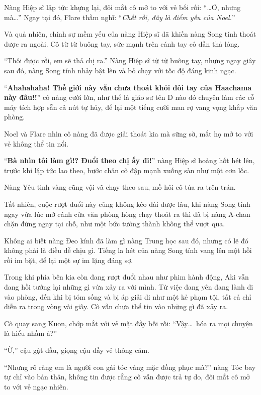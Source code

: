 \documentclass[../main.tex]{subfiles}
\begin{document}
Nàng Hiệp sĩ lập tức khựng lại, đôi mắt cô mở to với vẻ bối rối: ``\dots Ơ, nhưng mà\dots'' Ngay tại đó, Flare thầm nghĩ: ``\textit{Chết rồi, đây là điểm yếu của Noel.}''

Và quả nhiên, chính sự mềm yếu của nàng Hiệp sĩ đã khiến nàng Song tính thoát được ra ngoài. Cô từ từ buông tay, sức mạnh trên cánh tay cô dần thả lỏng.

``Thôi được rồi, em sẽ thả chị ra.'' Nàng Hiệp sĩ từ từ buông tay, nhưng ngay giây sau đó, nàng Song tính nhảy bật lên và bỏ chạy với tốc độ đáng kinh ngạc.

``\textbf{Ahahahaha! Thế giới này vẫn chưa thoát khỏi đôi tay của Haachama này đâu!!}'' cô nàng cười lớn, như thể là giáo sư tên D nào đó chuyên làm các cỗ máy tích hợp sẵn cả nút tự hủy, để lại một tiếng cười man rợ vang vọng khắp văn phòng.

Noel và Flare nhìn cô nàng đã được giải thoát kia mà sững sờ, mắt họ mở to với vẻ không thể tin nổi.

``\textbf{Bà nhìn tôi làm gì!? Đuổi theo chị ấy đi!}'' nàng Hiệp sĩ hoảng hốt hét lên, trước khi lập tức lao theo, bước chân cô đập mạnh xuống sàn như một cơn lốc.

Nàng Yêu tinh vàng cũng vội vã chạy theo sau, mồ hôi cô túa ra trên trán.

Tất nhiên, cuộc rượt đuổi này cũng không kéo dài được lâu, khi nàng Song tính ngay vừa lúc mở cánh cửa văn phòng hòng chạy thoát ra thì đã bị nàng A-chan chặn đứng ngay tại chỗ, như một bức tường thành không thể vượt qua.

Không ai biết nàng Đeo kính đã làm gì nàng Trung học sau đó, nhưng có lẽ đó không phải là điều dễ chịu gì. Tiếng la hét của nàng Song tính vang lên một hồi rồi im bặt, để lại một sự im lặng đáng sợ.

Trong khi phía bên kia còn đang rượt đuổi nhau như phim hành động, Aki vẫn đang hồi tưởng lại những gì vừa xảy ra với mình. Từ việc đang yên đang lành đi vào phòng, đến khi bị tóm sống và bị áp giải đi như một kẻ phạm tội, tất cả chỉ diễn ra trong vòng vài giây. Cô vẫn chưa thể tin vào những gì đã xảy ra.

Cô quay sang Kuon, chớp mắt với vẻ mặt đầy bối rối: ``Vậy\dots\ hóa ra mọi chuyện là hiểu nhầm à?''

``Ừ,'' cậu gật đầu, giọng cậu đầy vẻ thông cảm.

``Nhưng rõ ràng em là người con gái tóc vàng mặc đồng phục mà?'' nàng Tóc bay tự chỉ vào bản thân, không tin được rằng cô vẫn được trả tự do, đôi mắt cô mở to với vẻ ngạc nhiên.
\end{document}
